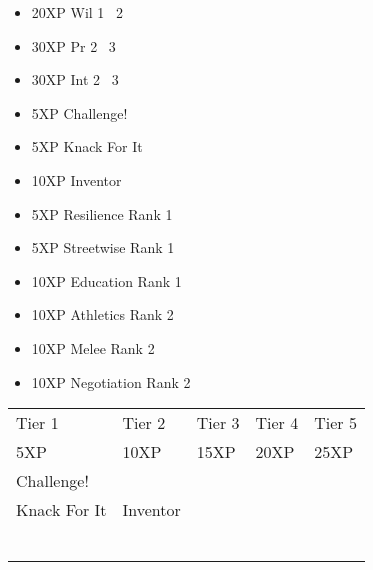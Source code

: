 \documentclass{article}
\begin{document}




\begin{multicols}{2}
\setlength{\columnseprule}{0.3pt}
\begin{itemize}[noitemsep]
\item 20XP Wil 1 \faArrowRight\ 2
\item 30XP Pr 2 \faArrowRight\ 3
\item 30XP Int 2 \faArrowRight\ 3
\item 5XP Challenge!
\item 5XP Knack For It
\item 10XP Inventor
\item 5XP Resilience Rank 1
\item 5XP Streetwise Rank 1
\item 10XP Education Rank 1
\item 10XP Athletics Rank 2
\item 10XP Melee Rank 2
\item 10XP Negotiation Rank 2
\end{itemize}
\end{multicols}


\vspace*{\fill}

\hfill{}


\pagebreak


\noindent\begin{tabu} to 
\rowfont{\bfseries\sffamily\centering} Tier 1 & Tier 2 & Tier 3 & Tier 4 & Tier 5\\
\rowfont{\small\sffamily\centering} 5XP & 10XP & 15XP & 20XP & 25XP\\
Challenge! \\
Knack For It & Inventor \\
 &  & \\
 &  & & \\
 &  & & & \\
 &  & & & \\
 &  & & & \\
 &  & & & \\

\end{tabu}
\end{document}
